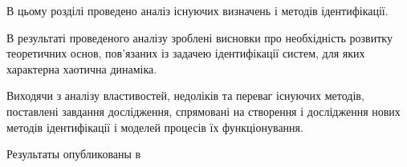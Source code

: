 В цьому розділі проведено аналіз існуючих визначень і методів
ідентифікації.

В результаті проведеного аналізу зроблені висновки про
необхідність розвитку теоретичних основ, пов'язаних із
задачею ідентифікації систем, для яких характерна хаотична
динаміка.

Виходячи з аналізу властивостей, недоліків та переваг існуючих методів,
поставлені завдання дослідження, спрямовані на створення і
дослідження нових методів ідентифікації і моделей процесів
їх функціонування.




Результаты опубликованы в




